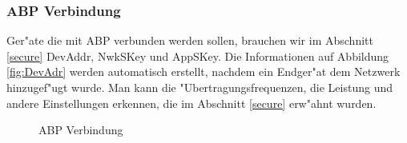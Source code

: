 \subsubsection{ABP Verbindung}
Ger"ate die mit ABP verbunden werden sollen, brauchen wir im Abschnitt
\ref{secure} DevAddr, NwkSKey und AppSKey.
Die Informationen auf Abbildung \ref{fig:DevAdr} werden automatisch
erstellt, nachdem ein Endger"at dem Netzwerk hinzugef"ugt wurde. Man
kann die "Ubertragungsfrequenzen, die Leistung und andere Einstellungen
erkennen, die im Abschnitt \ref{secure} erw"ahnt wurden. 
	\begin{figure}[h!]
	\centering
	\caption{ABP Verbindung}
	\end{figure}

